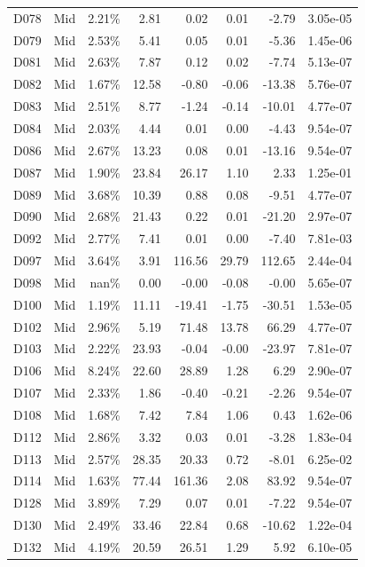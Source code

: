 \begin{tabular}{l l r r r r r r}
D078 & Mid & 2.21\% & 2.81 & 0.02 & 0.01 & -2.79 & 3.05e-05 \\
D079 & Mid & 2.53\% & 5.41 & 0.05 & 0.01 & -5.36 & 1.45e-06 \\
D081 & Mid & 2.63\% & 7.87 & 0.12 & 0.02 & -7.74 & 5.13e-07 \\
D082 & Mid & 1.67\% & 12.58 & -0.80 & -0.06 & -13.38 & 5.76e-07 \\
D083 & Mid & 2.51\% & 8.77 & -1.24 & -0.14 & -10.01 & 4.77e-07 \\
D084 & Mid & 2.03\% & 4.44 & 0.01 & 0.00 & -4.43 & 9.54e-07 \\
D086 & Mid & 2.67\% & 13.23 & 0.08 & 0.01 & -13.16 & 9.54e-07 \\
D087 & Mid & 1.90\% & 23.84 & 26.17 & 1.10 & 2.33 & 1.25e-01 \\
D089 & Mid & 3.68\% & 10.39 & 0.88 & 0.08 & -9.51 & 4.77e-07 \\
D090 & Mid & 2.68\% & 21.43 & 0.22 & 0.01 & -21.20 & 2.97e-07 \\
D092 & Mid & 2.77\% & 7.41 & 0.01 & 0.00 & -7.40 & 7.81e-03 \\
D097 & Mid & 3.64\% & 3.91 & 116.56 & 29.79 & 112.65 & 2.44e-04 \\
D098 & Mid & nan\% & 0.00 & -0.00 & -0.08 & -0.00 & 5.65e-07 \\
D100 & Mid & 1.19\% & 11.11 & -19.41 & -1.75 & -30.51 & 1.53e-05 \\
D102 & Mid & 2.96\% & 5.19 & 71.48 & 13.78 & 66.29 & 4.77e-07 \\
D103 & Mid & 2.22\% & 23.93 & -0.04 & -0.00 & -23.97 & 7.81e-07 \\
D106 & Mid & 8.24\% & 22.60 & 28.89 & 1.28 & 6.29 & 2.90e-07 \\
D107 & Mid & 2.33\% & 1.86 & -0.40 & -0.21 & -2.26 & 9.54e-07 \\
D108 & Mid & 1.68\% & 7.42 & 7.84 & 1.06 & 0.43 & 1.62e-06 \\
D112 & Mid & 2.86\% & 3.32 & 0.03 & 0.01 & -3.28 & 1.83e-04 \\
D113 & Mid & 2.57\% & 28.35 & 20.33 & 0.72 & -8.01 & 6.25e-02 \\
D114 & Mid & 1.63\% & 77.44 & 161.36 & 2.08 & 83.92 & 9.54e-07 \\
D128 & Mid & 3.89\% & 7.29 & 0.07 & 0.01 & -7.22 & 9.54e-07 \\
D130 & Mid & 2.49\% & 33.46 & 22.84 & 0.68 & -10.62 & 1.22e-04 \\
D132 & Mid & 4.19\% & 20.59 & 26.51 & 1.29 & 5.92 & 6.10e-05 \\

\end{tabular}

